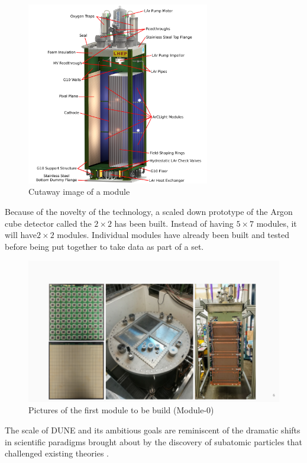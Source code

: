 \begin{figure}[H]
  \centering
  \includegraphics[width=80mm]{figures/ndModule.png}
  \caption{Cutaway image of a module\cite{DUNE_2020b}}
  \label{ndModule}
\end{figure}

Because of the novelty of the technology, a scaled down prototype  of the Argon cube detector called the $2 \times 2$ has been built.
Instead of having $5 \times7$ modules, it will have$2 \times 2$ modules.
Individual modules have already been built and tested before being put together to take data as part of a set.

\begin{figure}[H]
  \centering
  \includegraphics[width=120mm]{figures/ndPic.png}
  \caption{Pictures of the first module to be build (Module-0)}
  \label{ndPic}
\end{figure}

The scale of DUNE and its ambitious goals are reminiscent of the dramatic shifts in scientific paradigms brought about by the discovery of subatomic particles that challenged existing theories \cite{dune_tdr}.




